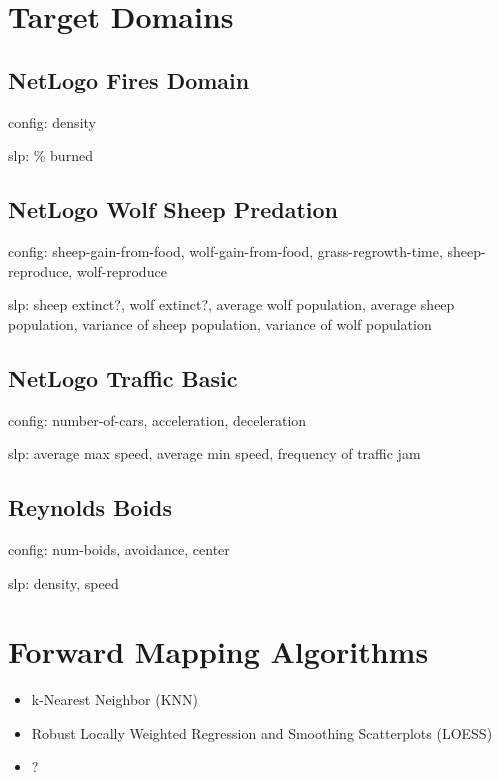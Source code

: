 \section{Target Domains}

 \subsection{NetLogo Fires Domain}\label{sec:Fires}

config: density

slp: \% burned

 \subsection{NetLogo Wolf Sheep Predation}

config: sheep-gain-from-food, wolf-gain-from-food, grass-regrowth-time, sheep-reproduce, wolf-reproduce

slp: sheep extinct?, wolf extinct?, average wolf population, average sheep population, variance of sheep population, variance of wolf population

 \subsection{NetLogo Traffic Basic}

config: number-of-cars, acceleration, deceleration

slp: average max speed, average min speed, frequency of traffic jam

 \subsection{Reynolds Boids}

config: num-boids, avoidance, center

slp: density, speed


\section{Forward Mapping Algorithms}

\begin{itemize}
 \item k-Nearest Neighbor (KNN)
 \item Robust Locally Weighted Regression and Smoothing Scatterplots (LOESS)
 \item ?
\end{itemize}



